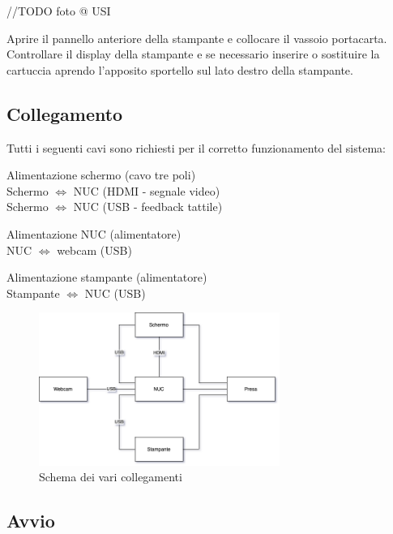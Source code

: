 \documentclass[12pt]{article}
\begin{document}
		//TODO foto @ USI
		
		Aprire il pannello anteriore della stampante e collocare il vassoio portacarta. Controllare il display della stampante e se necessario inserire o sostituire la cartuccia aprendo l'apposito sportello sul lato destro della stampante.
		
		
	\subsection{Collegamento}
	
		Tutti i seguenti cavi sono richiesti per il corretto funzionamento del sistema:
	
		Alimentazione schermo (cavo tre poli)\\
		Schermo $\Leftrightarrow$ NUC (HDMI - segnale video)\\
		Schermo $\Leftrightarrow$ NUC (USB - feedback tattile)
		
		Alimentazione NUC (alimentatore)\\
		NUC $\Leftrightarrow$ webcam (USB)
		
		Alimentazione stampante (alimentatore)\\
		Stampante $\Leftrightarrow$ NUC (USB)\\
	
		\begin{figure}[H]
                \centering
                \includegraphics[width=0.7\textwidth]{img/cables_it.png}
                \caption{Schema dei vari collegamenti}
                \label{cables}
        \end{figure}
		
		
	\subsection{Avvio}
	
\end{document}
